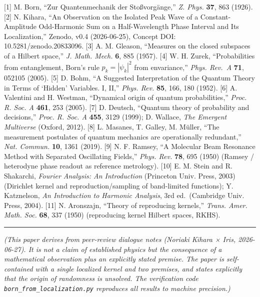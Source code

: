 \documentclass[
]{ltjsarticle}
\begin{document}
{[}1{]} M. Born, ``Zur Quantenmechanik der Stoßvorgänge,'' \emph{Z.
Phys.} \textbf{37}, 863 (1926). {[}2{]} N. Kihara, ``An Observation on
the Isolated Peak Wave of a Constant-Amplitude Odd-Harmonic Sum on a
Half-Wavelength Phase Interval and Its Localization,'' Zenodo, v0.4
(2026-06-25), Concept DOI: 10.5281/zenodo.20833096. {[}3{]} A. M.
Gleason, ``Measures on the closed subspaces of a Hilbert space,''
\emph{J. Math. Mech.} \textbf{6}, 885 (1957). {[}4{]} W. H. Zurek,
``Probabilities from entanglement, Born's rule \(p_k=|\psi_k|^2\) from
envariance,'' \emph{Phys. Rev.~A} \textbf{71}, 052105 (2005). {[}5{]} D.
Bohm, ``A Suggested Interpretation of the Quantum Theory in Terms of
`Hidden' Variables. I, II,'' \emph{Phys. Rev.} \textbf{85}, 166, 180
(1952). {[}6{]} A. Valentini and H. Westman, ``Dynamical origin of
quantum probabilities,'' \emph{Proc. R. Soc. A} \textbf{461}, 253
(2005). {[}7{]} D. Deutsch, ``Quantum theory of probability and
decisions,'' \emph{Proc. R. Soc. A} \textbf{455}, 3129 (1999); D.
Wallace, \emph{The Emergent Multiverse} (Oxford, 2012). {[}8{]} L.
Masanes, T. Galley, M. Müller, ``The measurement postulates of quantum
mechanics are operationally redundant,'' \emph{Nat. Commun.}
\textbf{10}, 1361 (2019). {[}9{]} N. F. Ramsey, ``A Molecular Beam
Resonance Method with Separated Oscillating Fields,'' \emph{Phys. Rev.}
\textbf{78}, 695 (1950) (Ramsey / heterodyne phase readout as reference
metrology). {[}10{]} E. M. Stein and R. Shakarchi, \emph{Fourier
Analysis: An Introduction} (Princeton Univ. Press, 2003) (Dirichlet
kernel and reproduction/sampling of band-limited functions); Y.
Katznelson, \emph{An Introduction to Harmonic Analysis}, 3rd
ed.~(Cambridge Univ. Press, 2004). {[}11{]} N. Aronszajn, ``Theory of
reproducing kernels,'' \emph{Trans. Amer. Math. Soc.} \textbf{68}, 337
(1950) (reproducing kernel Hilbert spaces, RKHS).

\begin{center}\rule{0.5\linewidth}{0.5pt}\end{center}

\emph{(This paper derives from peer-review dialogue notes (Noriaki
Kihara × Iris, 2026-06-27). It is not a claim of established physics but
the consequence of a mathematical observation plus an explicitly stated
premise. The paper is self-contained with a single localized kernel and
two premises, and states explicitly that the origin of randomness is
unsolved. The verification code \texttt{born\_from\_localization.py}
reproduces all results to machine precision.)}
\end{document}
